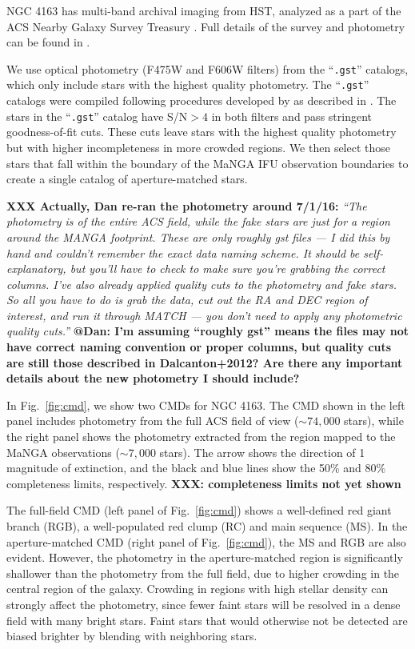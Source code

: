 \documentclass[preprint2]{aastex62}
\begin{document}
NGC 4163 has multi-band archival imaging from HST, analyzed as a part of the ACS Nearby Galaxy Survey Treasury \citep[ANGST;][]{Dalcanton+2009, Dalcanton+2012}. Full details of the survey and photometry can be found in \citet{Dalcanton+2009}.

We use optical photometry (F475W and F606W filters) from the ``{\tt .gst}'' catalogs, which only include stars with the highest quality photometry. The ``{\tt .gst}'' catalogs were compiled following procedures developed by \citet{Dolphin+2000} as described in \citet{Dalcanton+2012}. The stars in the ``{\tt .gst}'' catalog have S/N$ > 4$ in both filters and pass stringent goodness-of-fit cuts. These cuts leave stars with the highest quality photometry but with higher incompleteness in more crowded regions. We then select those stars that fall within the boundary of the MaNGA IFU observation boundaries to create a single catalog of aperture-matched stars.

\textbf{XXX Actually, Dan re-ran the photometry around 7/1/16: }\emph{``The photometry is of the entire ACS field, while the fake stars are just for a region around the MANGA footprint. These are only roughly gst files — I did this by hand and couldn't remember the exact data naming scheme.  It should be self-explanatory, but you'll have to check to make sure you're grabbing the correct columns. I've also already applied quality cuts to the photometry and fake stars.  So all you have to do is grab the data, cut out the RA and DEC region of interest, and run it through MATCH — you don't need to apply any photometric quality cuts.''} \textbf{@Dan: I'm assuming ``roughly gst'' means the files may not have correct naming convention or proper columns, but quality cuts are still those described in Dalcanton+2012? Are there any important details about the new photometry I should include?}

In Fig.~\ref{fig:cmd}, we show two CMDs for NGC 4163. The CMD shown in the left panel includes photometry from the full ACS field of view (${\sim}74,000$ stars), while the right panel shows the photometry extracted from the region mapped to the MaNGA observations (${\sim}7,000$ stars). The arrow shows the direction of 1 magnitude of extinction, and the black and blue lines show the 50\% and 80\% completeness limits, respectively. \textbf{XXX: completeness limits not yet shown}

The full-field CMD (left panel of Fig.~\ref{fig:cmd}) shows a well-defined red giant branch (RGB), a well-populated red clump (RC) and main sequence (MS). In the aperture-matched CMD (right panel of Fig.~\ref{fig:cmd}), the MS and RGB are also evident. However, the photometry in the aperture-matched region is significantly shallower than the photometry from the full field, due to higher crowding in the central region of the galaxy. Crowding in regions with high stellar density can strongly affect the photometry, since fewer faint stars will be resolved in a dense field with many bright stars. Faint stars that would otherwise not be detected are biased brighter by blending with neighboring stars.
\end{document}
